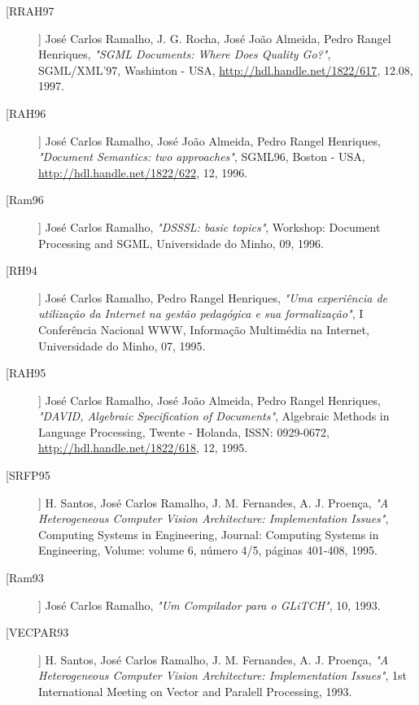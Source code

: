 \begin{description}
\item[[RRAH97]]
    \textsf{José Carlos Ramalho, J. G. Rocha, José João Almeida, Pedro Rangel Henriques}, \emph{"SGML Documents: Where Does Quality Go?"}, SGML/XML'97, Washinton - USA, \url{http://hdl.handle.net/1822/617}, 12.08, 1997.

\item[[RAH96]]
    \textsf{José Carlos Ramalho, José João Almeida, Pedro Rangel Henriques}, \emph{"Document Semantics: two approaches"}, SGML96, Boston - USA, \url{http://hdl.handle.net/1822/622}, 12, 1996.

\item[[Ram96]]
    \textsf{José Carlos Ramalho}, \emph{"DSSSL: basic topics"}, Workshop: Document    Processing and SGML, Universidade do Minho, 09, 1996.

\item[[RH94]]
    \textsf{José Carlos Ramalho, Pedro Rangel Henriques}, \emph{"Uma experiência de utilização da Internet na gestão pedagógica e sua formalização"}, I Conferência Nacional WWW,    Informação Multimédia na Internet, Universidade do Minho, 07, 1995.

\item[[RAH95]]
    \textsf{José Carlos Ramalho, José João Almeida, Pedro Rangel Henriques}, \emph{"DAVID, Algebraic Specification of Documents"}, Algebraic Methods in Language Processing, Twente - Holanda, ISSN: 0929-0672, \url{http://hdl.handle.net/1822/618}, 12, 1995.

\item[[SRFP95]]
    \textsf{H. Santos, José Carlos Ramalho, J. M. Fernandes, A. J. Proença}, \emph{"A Heterogeneous Computer Vision Architecture: Implementation Issues"}, Computing Systems in Engineering, Journal: Computing Systems in Engineering, Volume: volume 6, número 4/5, páginas 401-408, 1995.

\item[[Ram93]]
    \textsf{José Carlos Ramalho}, \emph{"Um Compilador para o GLiTCH"}, 10, 1993.

\item[[VECPAR93]]
    \textsf{H. Santos, José Carlos Ramalho, J. M. Fernandes, A. J. Proença}, \emph{"A Heterogeneous Computer Vision Architecture: Implementation Issues"}, 1st International Meeting on Vector and Paralell Processing, 1993.
\end{description}

